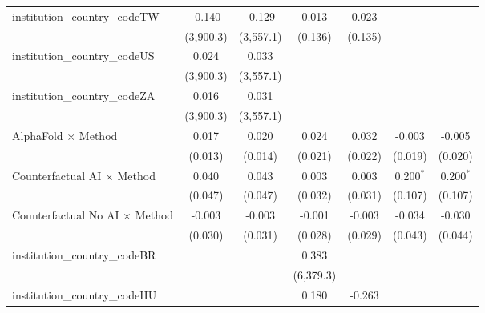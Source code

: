 \begin{tabular}{lcccccc}
   institution\_country\_codeTW          & -0.140         & -0.129         & 0.013         & 0.023         &                &   \\   
                                         & (3,900.3)      & (3,557.1)      & (0.136)       & (0.135)       &                &   \\   
   institution\_country\_codeUS          & 0.024          & 0.033          &               &               &                &   \\   
                                         & (3,900.3)      & (3,557.1)      &               &               &                &   \\   
   institution\_country\_codeZA          & 0.016          & 0.031          &               &               &                &   \\   
                                         & (3,900.3)      & (3,557.1)      &               &               &                &   \\   
   AlphaFold $\times$ Method             & 0.017          & 0.020          & 0.024         & 0.032         & -0.003         & -0.005\\   
                                         & (0.013)        & (0.014)        & (0.021)       & (0.022)       & (0.019)        & (0.020)\\   
   Counterfactual AI $\times$ Method     & 0.040          & 0.043          & 0.003         & 0.003         & 0.200$^{*}$    & 0.200$^{*}$\\   
                                         & (0.047)        & (0.047)        & (0.032)       & (0.031)       & (0.107)        & (0.107)\\   
   Counterfactual No AI $\times$ Method  & -0.003         & -0.003         & -0.001        & -0.003        & -0.034         & -0.030\\   
                                         & (0.030)        & (0.031)        & (0.028)       & (0.029)       & (0.043)        & (0.044)\\   
   institution\_country\_codeBR          &                &                & 0.383         &               &                &   \\   
                                         &                &                & (6,379.3)     &               &                &   \\   
   institution\_country\_codeHU          &                &                & 0.180         & -0.263        &                &   \\   

\end{tabular}
